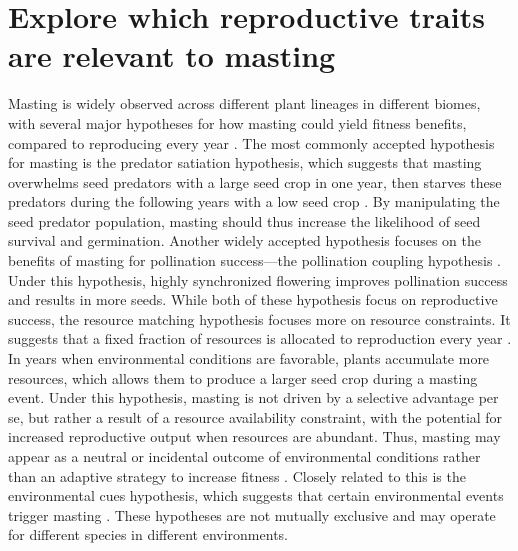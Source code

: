 \documentclass[11pt,letter]{article}
\begin{document}
\section{Explore which reproductive traits are relevant to masting}
Masting is widely observed across different plant lineages in different biomes, with several major hypotheses for how masting could yield fitness benefits, compared to reproducing every year \citep{koenig2021brief, waller1979models}. The most commonly accepted hypothesis for masting is the predator satiation hypothesis, which suggests that masting overwhelms seed predators with a large seed crop in one year, then starves these predators during the following years with a low seed crop \citep{janzen1971seed}. By manipulating the seed predator population, masting should thus increase the likelihood of seed survival and germination. Another widely accepted hypothesis focuses on the benefits of masting for pollination success---the pollination coupling hypothesis \citep{crone2014resource}. Under this hypothesis, highly synchronized flowering improves pollination success and results in more seeds. While both of these hypothesis focus on reproductive success, the resource matching hypothesis focuses more on resource constraints. It suggests that a fixed fraction of resources is allocated to reproduction every year \citep{kelly1994evolutionary}. In years when environmental conditions are favorable, plants accumulate more resources, which allows them to produce a larger seed crop during a masting event. Under this hypothesis, masting is not driven by a selective advantage per se, but rather a result of a resource availability constraint, with the potential for increased reproductive output when resources are abundant. Thus, masting may appear as a neutral or incidental outcome of environmental conditions rather than an adaptive strategy to increase fitness \citep{isagi1997does}. Closely related to this is the environmental cues hypothesis, which suggests that certain environmental events trigger masting \citep{pearse2016mechanisms}. These hypotheses are not mutually exclusive and may operate for different species in different environments.\par
\end{document}
